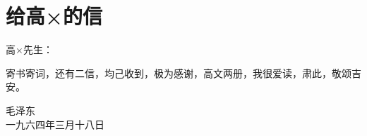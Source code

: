 \section[给高×的信（一九六四年三月十八日）]{给高×的信}


高×先生：

寄书寄词，还有二信，均己收到，极为感谢，高文两册，我很爱读，肃此，敬颂吉安。
{\raggedleft 毛泽东\\一九六四年三月十八日\par}


